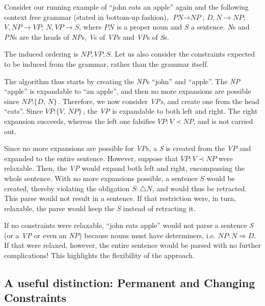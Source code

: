 \documentclass{llncs}
\newcommand{\constituency}[2]{\textit{#1} : \textit{#2}}
\newcommand{\obligation}[2]{\textit{#1} : \triangle \textit{#2}}
\newcommand{\precedence}[3]{\textit{#1} : \textit{#2} \prec \textit{#3}}
\newcommand{\requirement}[3]{\textit{#1} : \textit{#2} \Rightarrow \textit{#3}}
\begin{document}
\begin{example}
  Consider our running example of ``john eats an apple'' again and the following context free grammar (stated in bottom-up fashion), $\textit{PN} \to \textit{NP}$; $D, N \to \textit{NP}$; $V,\textit{NP} \to \textit{VP}$; $N, \textit{VP} \to S$, where $\textit{PN}$ is a proper noun and $S$ a sentence. \textit{N}s and \textit{PN}s are the heads of \textit{NP}s, \textit{V}s of \textit{VP}s and \textit{VP}s of \textit{S}s.
  
  The induced ordering is $\textit{NP},\textit{VP},\textit{S}$. Let us also consider the constraints expected to be induced from the grammar, rather than the grammar itself.

The algorithm thus starts by creating the \textit{NP}s ``john'' and ``apple''. The \textit{NP} ``apple'' is expandable to ``an apple'', and then no more expansions are possible since $\constituency{NP}{\{D, N\}}$. Therefore, we now consider \textit{VPs}, and create one from the head ``eats''. Since $\constituency{VP}{\{V, NP\}}$, the \textit{VP} is expandable to both left and right. The right expansion succeeds, whereas the left one falsifies $\precedence{VP}{V}{NP}$, and is not carried out.

Since no more expansions are possible for \textit{VP}s, a \textit{S} is created from the \textit{VP} and expanded to the entire sentence. However, suppose that $\precedence{VP}{V}{NP}$ were relaxable. Then, the \textit{VP} would expand both left and right, encompassing the whole sentence. With no more expansions possible, a sentence $S$ would be created, thereby violating the obligation $\obligation{S}{N}$, and would thus be retracted. This parse would not result in a sentence. If that restriction were, in turn, relaxable, the parse would keep the \textit{S} instead of retracting it.

If no constraints were relaxable, ``john eats apple'' would not parse a sentence \textit{S} (or a \textit{VP} or even an \textit{NP}) because nouns must have determiners, i.e. $\requirement{NP}{N}{D}$. If that were relaxed, however, the entire sentence would be parsed with no further complications! This highlights the flexibility of the approach.
\end{example}

\subsection{A useful distinction: Permanent and Changing Constraints}
\end{document}
